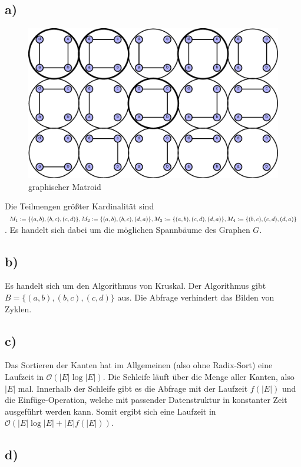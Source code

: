 \documentclass[a4paper,11pt,twoside]{scrartcl}
\begin{document}
\subsection*{a)}
\begin{figure}[H]
\centering
\includegraphics[width=0.9\linewidth]{Images/Matroid}
\caption{graphischer Matroid}
\label{fig:Matroid}
\end{figure}

Die Teilmengen größter Kardinalität sind $M_1:=\{ (a,b),(b,c),(c,d) \},M_2:=\{ (a,b),(b,c),(d,a) \},\\M_3:=\{ (a,b),(c,d),(d,a) \},M_4:=\{ (b,c),(c,d),(d,a) \}$. Es handelt sich dabei um die möglichen Spannbäume des Graphen $G$.
\subsection*{b)}
Es handelt sich um den Algorithmus von Kruskal. Der Algorithmus gibt $B=\{ (a,b),(b,c),(c,d) \}$ aus. Die Abfrage verhindert das Bilden von Zyklen.
\subsection*{c)}
Das Sortieren der Kanten hat im Allgemeinen (also ohne Radix-Sort) eine Laufzeit in $\mathcal{O}(|E| \log |E|)$. Die Schleife läuft über die Menge aller Kanten, also $|E|$ mal. Innerhalb der Schleife gibt es die Abfrage mit der Laufzeit $f(|E|)$ und die Einfüge-Operation, welche mit passender Datenstruktur in konstanter Zeit ausgeführt werden kann. Somit ergibt sich eine Laufzeit in $\mathcal{O}(|E|\log|E|+|E|f(|E|))$.
\subsection*{d)}
\end{document}
